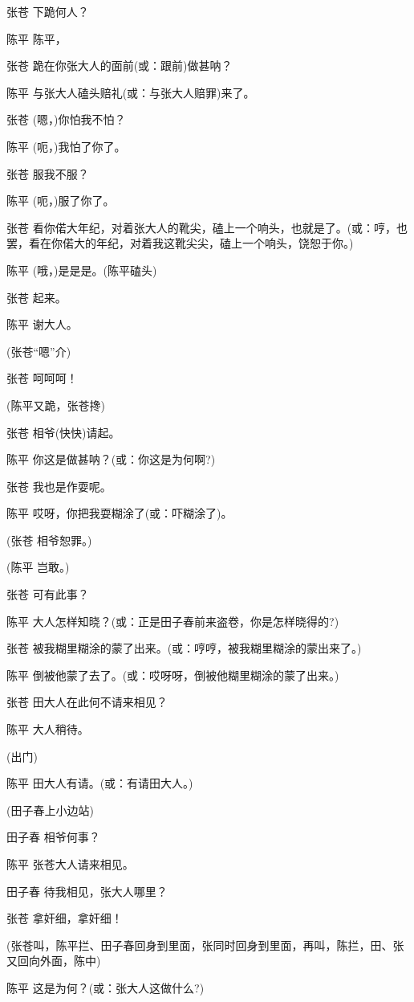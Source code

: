 张苍 下跪何人？

陈平 陈平，

张苍 跪在你张大人的面前(或：跟前)做甚呐？

陈平 与张大人磕头赔礼(或：与张大人赔罪)来了。

张苍 (嗯，)你怕我不怕？

陈平 (呃，)我怕了你了。

张苍 服我不服？

陈平 (呃，)服了你了。

张苍
看你偌大年纪，对着张大人的靴尖，磕上一个响头，也就是了。(或：哼，也罢，看在你偌大的年纪，对着我这靴尖尖，磕上一个响头，饶恕于你。)

陈平 (哦，)是是是。(陈平磕头)

张苍 起来。

陈平 谢大人。

(张苍``嗯''介)

张苍 呵呵呵！

(陈平又跪，张苍搀)

张苍 相爷(快快)请起。

陈平 你这是做甚呐？(或：你这是为何啊?)

张苍 我也是作耍呢。

陈平 哎呀，你把我耍糊涂了(或：吓糊涂了)。

(张苍 相爷恕罪。)

(陈平 岂敢。)

张苍 可有此事？

陈平 大人怎样知晓？(或：正是田子春前来盗卷，你是怎样晓得的?)

张苍 被我糊里糊涂的蒙了出来。(或：哼哼，被我糊里糊涂的蒙出来了。)

陈平 倒被他蒙了去了。(或：哎呀呀，倒被他糊里糊涂的蒙了出来。)

张苍 田大人在此何不请来相见？

陈平 大人稍待。

(出门)

陈平 田大人有请。(或：有请田大人。)

(田子春上小边站)

田子春 相爷何事？

陈平 张苍大人请来相见。

田子春 待我相见，张大人哪里？

张苍 拿奸细，拿奸细！

(张苍叫，陈平拦、田子春回身到里面，张同时回身到里面，再叫，陈拦，田、张又回向外面，陈中)

陈平 这是为何？(或：张大人这做什么?)

